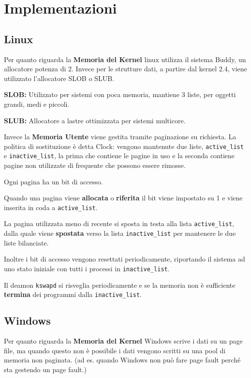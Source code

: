 \section{Implementazioni}
\subsection{Linux}
Per quanto riguarda la \textbf{Memoria del Kernel} linux utilizza il sistema Buddy, un allocatore potenza di 2.
Invece per le strutture dati, a partire dal kernel 2.4, viene utilizzato l'allocatore SLOB o SLUB.
\begin{sitemize}
    \item \textbf{SLOB:} Utilizzato per sistemi con poca memoria, mantiene 3 liste, per oggetti grandi, medi e piccoli.
    \item \textbf{SLUB:} Allocatore a lastre ottimizzata per sistemi multicore.
\end{sitemize}

\spacer
Invece la \textbf{Memoria Utente} viene gestita tramite paginazione su richiesta.
La politica di sostituzione è detta Clock: vengono mantenute due liste, \texttt{active\_list} e \texttt{inactive\_list}, la prima che contiene le pagine in uso e la seconda contiene pagine non utilizzate di frequente che possono essere rimosse.

\spacer
Ogni pagina ha un bit di accesso.
\begin{sitemize}
    \item Quando una pagina viene \textbf{allocata} o \textbf{riferita} il bit viene impostato su 1 e viene inserita in coda a \texttt{active\_list}.
    \item La pagina utilizzata meno di recente si sposta in testa alla lista \texttt{active\_list}, dalla quale viene \textbf{spostata} verso la lista \texttt{inactive\_list} per mantenere le due liste bilanciate.
    \item Inoltre i bit di accesso vengono resettati periodicamente, riportando il sistema ad uno stato iniziale con tutti i processi in \texttt{inactive\_list}.
    \item Il deamon \texttt{kswapd} si risveglia periodicamente e se la memoria non è sufficiente \textbf{termina} dei programmi dalla \texttt{inactive\_list}.
\end{sitemize}

\subsection{Windows}
Per quanto riguarda la \textbf{Memoria del Kernel} Windows scrive i dati su un page file, ma quando questo non è possibile i dati vengono scritti su una pool di memoria non paginata. (ad es. quando Windows non può fare page fault perché sta gestendo un page fault.)

